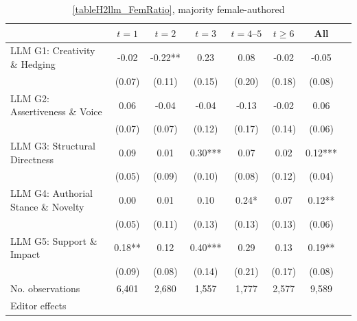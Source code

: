 \begin{table}
    \footnotesize
    \centering
    \begin{threeparttable}
        \caption{\autoref{tableH2llm_FemRatio}, majority female-authored}
        \label{tableH2llm_Fem50}
        \begin{tabular}{p{3cm}S@{}S@{}S@{}S@{}S@{}S@{}S@{}}
            \toprule
            &{\(t=1\)}&{\(t=2\)}&{\(t=3\)}&{\(t=4\text{--}5\)}&{\(t\ge6\)}&{All}\\
            \midrule
            LLM G1: Creativity \& Hedging &       -0.02   &       -0.22** &        0.23   &        0.08   &       -0.02   &       -0.05   \\
                                          &      (0.07)   &      (0.11)   &      (0.15)   &      (0.20)   &      (0.18)   &      (0.08)   \\
            LLM G2: Assertiveness \& Voice&        0.06   &       -0.04   &       -0.04   &       -0.13   &       -0.02   &        0.06   \\
                                          &      (0.07)   &      (0.07)   &      (0.12)   &      (0.17)   &      (0.14)   &      (0.06)   \\
            LLM G3: Structural Directness &        0.09   &        0.01   &        0.30***&        0.07   &        0.02   &        0.12***\\
                                          &      (0.05)   &      (0.09)   &      (0.10)   &      (0.08)   &      (0.12)   &      (0.04)   \\
            LLM G4: Authorial Stance \& Novelty&        0.00   &        0.01   &        0.10   &        0.24*  &        0.07   &        0.12** \\
                                          &      (0.05)   &      (0.11)   &      (0.13)   &      (0.13)   &      (0.13)   &      (0.06)   \\
            LLM G5: Support \& Impact     &        0.18** &        0.12   &        0.40***&        0.29   &        0.13   &        0.19** \\
                                          &      (0.09)   &      (0.08)   &      (0.14)   &      (0.21)   &      (0.17)   &      (0.08)   \\
            \midrule
            No. observations              &       6,401   &       2,680   &       1,557   &       1,777   &       2,577   &       9,589   \\
            \midrule
Editor effects        &           {}   &           {}   &           {}   &           {}   &           {}   &           {}   \\

\end{tabular}
\end{threeparttable}
\end{table}
